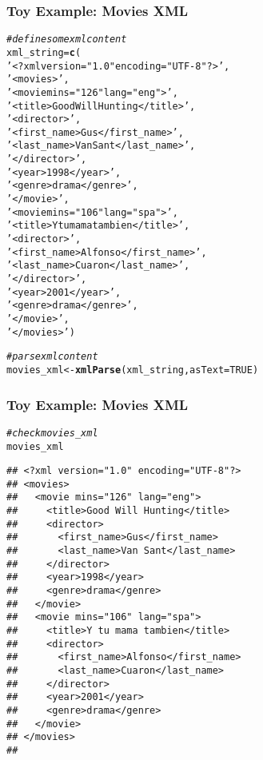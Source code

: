 \documentclass[12pt]{beamer}\usepackage[]{graphicx}\usepackage[]{color}
\makeatletter
\newcommand{\hlnum}[1]{\textcolor[rgb]{0.686,0.059,0.569}{#1}}%
\newcommand{\hlstr}[1]{\textcolor[rgb]{0.192,0.494,0.8}{#1}}%
\newcommand{\hlcom}[1]{\textcolor[rgb]{0.678,0.584,0.686}{\textit{#1}}}%
\newcommand{\hlstd}[1]{\textcolor[rgb]{0.345,0.345,0.345}{#1}}%
\newcommand{\hlkwb}[1]{\textcolor[rgb]{0.69,0.353,0.396}{#1}}%
\newcommand{\hlkwc}[1]{\textcolor[rgb]{0.333,0.667,0.333}{#1}}%
\newcommand{\hlkwd}[1]{\textcolor[rgb]{0.737,0.353,0.396}{\textbf{#1}}}%
\newenvironment{kframe}{%
 \def\at@end@of@kframe{}%
 \ifinner\ifhmode%
  \def\at@end@of@kframe{\end{minipage}}%
  \begin{minipage}{\columnwidth}%
 \fi\fi%
 \def\FrameCommand##1{\hskip\@totalleftmargin \hskip-\fboxsep
 \colorbox{shadecolor}{##1}\hskip-\fboxsep
     \hskip-\linewidth \hskip-\@totalleftmargin \hskip\columnwidth}%
 \MakeFramed {\advance\hsize-\width
   \@totalleftmargin\z@ \linewidth\hsize
   \@setminipage}}%
 {\par\unskip\endMakeFramed%
 \at@end@of@kframe}
\newenvironment{knitrout}{}{} %
\makeatother
\begin{document}
\begin{frame}[fragile]
\frametitle{Toy Example: Movies XML}

\begin{knitrout}\tiny
{}\color{fgcolor}\begin{kframe}
\begin{alltt}
\hlcom{# define some xml content}
\hlstd{xml_string} \hlkwb{=} \hlkwd{c}\hlstd{(}
  \hlstr{'<?xml version="1.0" encoding="UTF-8"?>'}\hlstd{,}
  \hlstr{'<movies>'}\hlstd{,}
  \hlstr{'<movie mins="126" lang="eng">'}\hlstd{,}
  \hlstr{'<title>Good Will Hunting</title>'}\hlstd{,}
  \hlstr{'<director>'}\hlstd{,}
  \hlstr{'<first_name>Gus</first_name>'}\hlstd{,}
  \hlstr{'<last_name>Van Sant</last_name>'}\hlstd{,}
  \hlstr{'</director>'}\hlstd{,}
  \hlstr{'<year>1998</year>'}\hlstd{,}
  \hlstr{'<genre>drama</genre>'}\hlstd{,}
  \hlstr{'</movie>'}\hlstd{,}
  \hlstr{'<movie mins="106" lang="spa">'}\hlstd{,}
  \hlstr{'<title>Y tu mama tambien</title>'}\hlstd{,}
  \hlstr{'<director>'}\hlstd{,}
  \hlstr{'<first_name>Alfonso</first_name>'}\hlstd{,}
  \hlstr{'<last_name>Cuaron</last_name>'}\hlstd{,}
  \hlstr{'</director>'}\hlstd{,}
  \hlstr{'<year>2001</year>'}\hlstd{,}
  \hlstr{'<genre>drama</genre>'}\hlstd{,}
  \hlstr{'</movie>'}\hlstd{,}
  \hlstr{'</movies>'}\hlstd{)}

\hlcom{# parse xml content}
\hlstd{movies_xml} \hlkwb{<-} \hlkwd{xmlParse}\hlstd{(xml_string,} \hlkwc{asText} \hlstd{=} \hlnum{TRUE}\hlstd{)}
\end{alltt}
\end{kframe}
\end{knitrout}

\end{frame}


\begin{frame}[fragile]
\frametitle{Toy Example: Movies XML}
\begin{knitrout}\tiny
{}\color{fgcolor}\begin{kframe}
\begin{alltt}
\hlcom{# check movies_xml}
\hlstd{movies_xml}
\end{alltt}
\begin{verbatim}
## <?xml version="1.0" encoding="UTF-8"?>
## <movies>
##   <movie mins="126" lang="eng">
##     <title>Good Will Hunting</title>
##     <director>
##       <first_name>Gus</first_name>
##       <last_name>Van Sant</last_name>
##     </director>
##     <year>1998</year>
##     <genre>drama</genre>
##   </movie>
##   <movie mins="106" lang="spa">
##     <title>Y tu mama tambien</title>
##     <director>
##       <first_name>Alfonso</first_name>
##       <last_name>Cuaron</last_name>
##     </director>
##     <year>2001</year>
##     <genre>drama</genre>
##   </movie>
## </movies>
## 
\end{verbatim}
\end{kframe}
\end{knitrout}

\end{frame}
\end{document}
